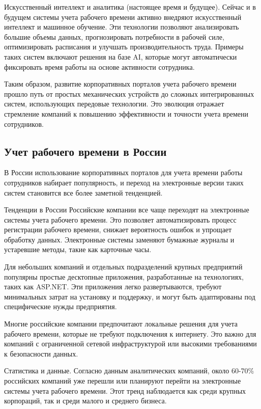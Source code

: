 Искусственный интеллект и аналитика (настоящее время и будущее). Сейчас и в будущем системы учета рабочего времени активно внедряют искусственный интеллект и машинное обучение. Эти технологии позволяют анализировать большие объемы данных, прогнозировать потребности в рабочей силе, оптимизировать расписания и улучшать производительность труда. Примеры таких систем включают решения на базе AI, которые могут автоматически фиксировать время работы на основе активности сотрудника.

Таким образом, развитие корпоративных порталов учета рабочего времени прошло путь от простых механических устройств до сложных интегрированных систем, использующих передовые технологии. Это эволюция отражает стремление компаний к повышению эффективности и точности учета времени сотрудников.

\subsection{Учет рабочего времени в России}
В России использование корпоративных порталов для учета времени работы сотрудников набирает популярность, и переход на электронные версии таких систем становится все более заметной тенденцией.

Тенденции в России
Российские компании все чаще переходят на электронные системы учета рабочего времени. Это позволяет автоматизировать процесс регистрации рабочего времени, снижает вероятность ошибок и упрощает обработку данных. Электронные системы заменяют бумажные журналы и устаревшие методы, такие как карточные часы.

Для небольших компаний и отдельных подразделений крупных предприятий популярны простые десктопные приложения, разработанные на технологиях, таких как ASP.NET. Эти приложения легко развертываются, требуют минимальных затрат на установку и поддержку, и могут быть адаптированы под специфические нужды предприятия.

Многие российские компании предпочитают локальные решения для учета рабочего времени, которые не требуют подключения к интернету. Это важно для компаний с ограниченной сетевой инфраструктурой или высокими требованиями к безопасности данных.

Статистика и данные. Согласно данным аналитических компаний, около 60-70\% российских компаний уже перешли или планируют перейти на электронные системы учета рабочего времени. Этот тренд наблюдается как среди крупных корпораций, так и среди малого и среднего бизнеса.

